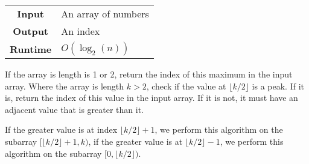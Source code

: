 \documentclass[a4paper, 12pt, twoside]{article}
\begin{document}
\begin{center}
      \begin{tabular}{ || c | p{8.5cm} || }
            \hline
                  \textbf{Input} & An array of numbers \\
                  \textbf{Output} & An index \\
            \hline\hline
                  \textbf{Runtime} & $O(\log_2(n))$ \\
            \hline
      \end{tabular}
\end{center}

If the array is length is 1 or 2, return the index of this maximum
in the input array. Where the array is length $k > 2$, check if 
the value at $\lfloor k / 2 \rfloor$ is a peak. If it is, return 
the index of this value in the input array. If it is not, it must 
have an adjacent value that is greater than it. 

\vspace{\baselineskip}

If the greater
value is at index $\lfloor k / 2 \rfloor + 1$, we perform this
algorithm on the subarray $[\lfloor k / 2 \rfloor + 1, k)$,
if the greater value is at $\lfloor k / 2 \rfloor - 1$, we perform
this algorithm on the subarray $[0, \lfloor k / 2 \rfloor)$.
\end{document}
